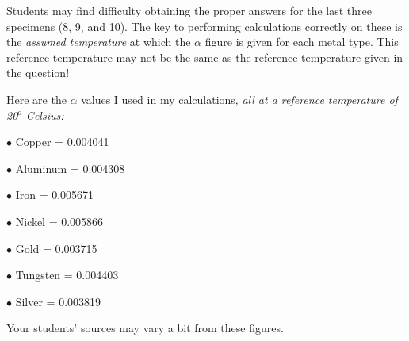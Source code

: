 





Students may find difficulty obtaining the proper answers for the last three specimens (8, 9, and 10).  The key to performing calculations correctly on these is the {\it assumed temperature} at which the $\alpha$ figure is given for each metal type.  This reference temperature may not be the same as the reference temperature given in the question!

Here are the $\alpha$ values I used in my calculations, {\it all at a reference temperature of 20$^{o}$ Celsius:}

\medskip
\item{$\bullet$} Copper = 0.004041
\item{$\bullet$} Aluminum = 0.004308
\item{$\bullet$} Iron = 0.005671 
\item{$\bullet$} Nickel = 0.005866
\item{$\bullet$} Gold = 0.003715
\item{$\bullet$} Tungsten = 0.004403
\item{$\bullet$} Silver = 0.003819
\medskip

Your students' sources may vary a bit from these figures.




